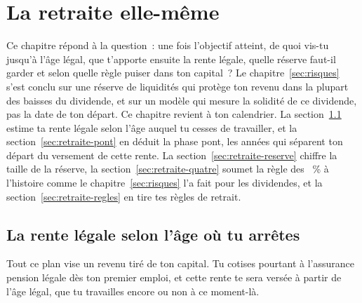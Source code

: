 \section{La retraite elle-m\^eme}\label{sec:retraite}

Ce chapitre r\'epond \`a la question~: une fois l'objectif atteint, de quoi vis-tu jusqu'\`a
l'\^age l\'egal, que t'apporte ensuite la rente l\'egale, quelle r\'eserve faut-il garder et selon
quelle r\`egle puiser dans ton capital~? Le chapitre~\ref{sec:risques} s'est conclu sur une r\'eserve
de liquidit\'es qui prot\`ege ton revenu dans la plupart des baisses du dividende, et sur un mod\`ele
qui mesure la solidit\'e de ce dividende, pas la date de ton d\'epart. Ce chapitre revient \`a ton
calendrier. La section~\ref{sec:retraite-rente} estime ta rente l\'egale selon l'\^age auquel tu
cesses de travailler, et la section~\ref{sec:retraite-pont} en d\'eduit la phase pont, les ann\'ees qui
s\'eparent ton d\'epart du versement de cette rente. La section~\ref{sec:retraite-reserve} chiffre la
taille de la r\'eserve, la section~\ref{sec:retraite-quatre} soumet la r\`egle des \TauxRetrait~\% \`a
l'histoire comme le chapitre~\ref{sec:risques} l'a fait pour les dividendes, et la
section~\ref{sec:retraite-regles} en tire tes r\`egles de retrait.

\subsection{La rente l\'egale selon l'\^age o\`u tu arr\^etes}\label{sec:retraite-rente}

Tout ce plan vise un revenu tir\'e de ton capital. Tu cotises pourtant \`a l'assurance pension
l\'egale d\`es ton premier emploi, et cette rente te sera vers\'ee \`a partir de l'\^age l\'egal, que
tu travailles encore ou non \`a ce moment-l\`a.

